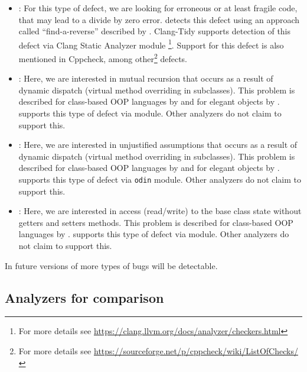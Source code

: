 \begin{itemize}
\item {}: For this type of defect, we are looking for erroneous or at least fragile code, that may lead to a divide by zero error. \polystat{} detects this defect using an approach called ``find-a-reverse'' described by \citet{eolang-far}.
Clang-Tidy supports detection of this defect via Clang Static Analyzer module \footnote{For more details see \url{https://clang.llvm.org/docs/analyzer/checkers.html}}.
Support for this defect is also mentioned in Cppcheck, among other\footnote{For more details see \url{https://sourceforge.net/p/cppcheck/wiki/ListOfChecks/}} defects.

\item {}: Here, we are interested in mutual recursion that occurs as a result of dynamic dispatch (virtual method overriding in subclasses). This problem is described for class-based OOP languages by \citet[Section 3.1]{MikhajlovSekerinski1998} and for elegant objects by \citet[Section 3.2]{KudasovShilovStepanov2021}. \polystat{} supports this type of defect via  module. Other analyzers do not claim to support this.

\item {}: Here, we are interested in unjustified assumptions that occurs as a result of dynamic dispatch (virtual method overriding in subclasses). This problem is described for class-based OOP languages by \citet[Section 3.3]{MikhajlovSekerinski1998} and for elegant objects by \citet{KudasovSim2022}. \polystat{} supports this type of defect via \texttt{odin} module. Other analyzers do not claim to support this.

\item {}: Here, we are interested in access (read/write) to the base class state without getters and setters methods. This problem is described for class-based OOP languages by \citet[Section 3.4]{MikhajlovSekerinski1998}. \polystat{} supports this type of defect via  module. Other analyzers do not claim to support this.
\end{itemize}

In future versions of \polystat{} more types of bugs will be detectable.

\subsection{Analyzers for comparison}

